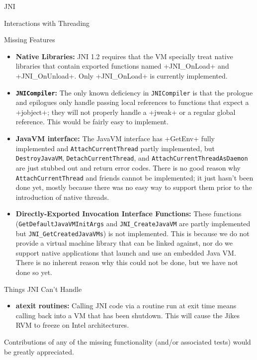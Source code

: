 \begin{section}{JNI}
\begin{subsection}{Interactions with Threading}
\end{subsection}

\begin{subsection}{Missing Features}

\begin{itemize}
  \item \textbf{Native Libraries:} JNI 1.2 requires that the VM specially treat native libraries that contain exported functions named \spverb+JNI_OnLoad+ and \newline \spverb+JNI_OnUnload+. Only \spverb+JNI_OnLoad+ is currently implemented.
  \item \textbf{\texttt{JNI\-Com\-pi\-ler}:} The only known deficiency in \texttt{JNI\-Com\-pi\-ler} is that the prologue and epilogues only handle passing local references to functions that expect a \spverb+jobject+; they will not properly handle a \spverb+jweak+ or a regular global reference. This would be fairly easy to implement.
  \item \textbf{JavaVM interface:} The JavaVM interface has \spverb+GetEnv+ fully implemented and \texttt{AttachCurrentThread} partly implemented, but \texttt{DestroyJavaVM}, \texttt{DetachCurrentThread}, and \texttt{AttachCurrentThreadAsDaemon} are just stubbed out and return error codes. There is no good reason why \texttt{AttachCurrentThread} and friends cannot be implemented; it just hasn't been done yet, mostly because there was no easy way to support them prior to the introduction of native threads.
  \item \textbf{Directly-Exported Invocation Interface Functions:} These functions (\texttt{Get\-De\-fault\-Ja\-va\-VM\-Init\-Args} and \texttt{JNI\_Cre\-ate\-Ja\-va\-VM} are partly implemented but \texttt{JNI\_Get\-Crea\-ted\-Ja\-va\-VMs}) is not implemented. This is because we do not provide a virtual machine library that can be linked against, nor do we support native applications that launch and use an embedded Java VM. There is no inherent reason why this could not be done, but we have not done so yet.
\end{itemize}

\end{subsection}

\begin{subsection}{Things JNI Can't Handle}

\begin{itemize}
  \item \textbf{atexit routines:} Calling JNI code via a routine run at exit time means calling back into a VM that has been shutdown. This will cause the Jikes RVM to freeze on Intel architectures.
\end{itemize}

Contributions of any of the missing functionality (and/or associated tests) would be greatly appreciated.

\end{subsection}

\end{section}
